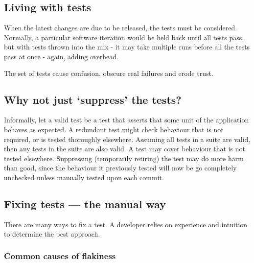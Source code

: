 \subsection{Living with \flaky{} tests}

When the latest changes are due to be released, the \flaky{} tests must be considered. Normally, a particular software iteration would be held back until all tests pass, but with \flaky{} tests thrown into the mix - it may take multiple runs before all the tests pass at once - again, adding overhead.

The set of \flaky{} tests cause confusion, obscure real failures and erode trust.


\subsection{Why not just ‘suppress’ the \flaky{} tests?}

Informally, let a valid test be a test that asserts that some unit of the application behaves as expected. A redundant test might check behaviour that is not required, or is tested thoroughly elsewhere. Assuming all tests in a suite are valid, then any \flaky{} tests in the suite are also valid. A \flaky{} test may cover behaviour that is not tested elsewhere. Suppressing (temporarily retiring) the \flaky{} test may do more harm than good, since the behaviour it previously tested will now be go completely unchecked unless manually tested upon each commit.


\subsection{Fixing \flaky{} tests --- the manual way}

There are many ways to fix a \flaky{} test. A developer relies on experience and intuition to determine the best approach.

\subsubsection{Common causes of flakiness}

